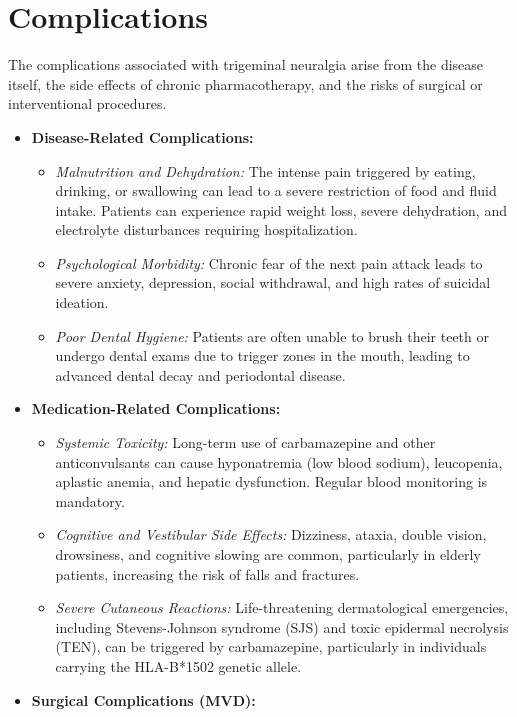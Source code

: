\section*{Complications}
The complications associated with trigeminal neuralgia arise from the disease itself, the side effects of chronic pharmacotherapy, and the risks of surgical or interventional procedures.
\begin{itemize}
  \item \textbf{Disease-Related Complications:}
  \begin{itemize}
    \item \textit{Malnutrition and Dehydration:} The intense pain triggered by eating, drinking, or swallowing can lead to a severe restriction of food and fluid intake. Patients can experience rapid weight loss, severe dehydration, and electrolyte disturbances requiring hospitalization.
    \item \textit{Psychological Morbidity:} Chronic fear of the next pain attack leads to severe anxiety, depression, social withdrawal, and high rates of suicidal ideation.
    \item \textit{Poor Dental Hygiene:} Patients are often unable to brush their teeth or undergo dental exams due to trigger zones in the mouth, leading to advanced dental decay and periodontal disease.
  \end{itemize}
  \item \textbf{Medication-Related Complications:}
  \begin{itemize}
    \item \textit{Systemic Toxicity:} Long-term use of carbamazepine and other anticonvulsants can cause hyponatremia (low blood sodium), leucopenia, aplastic anemia, and hepatic dysfunction. Regular blood monitoring is mandatory.
    \item \textit{Cognitive and Vestibular Side Effects:} Dizziness, ataxia, double vision, drowsiness, and cognitive slowing are common, particularly in elderly patients, increasing the risk of falls and fractures.
    \item \textit{Severe Cutaneous Reactions:} Life-threatening dermatological emergencies, including Stevens-Johnson syndrome (SJS) and toxic epidermal necrolysis (TEN), can be triggered by carbamazepine, particularly in individuals carrying the HLA-B*1502 genetic allele.
  \end{itemize}
  \item \textbf{Surgical Complications (MVD):}
  \begin{itemize}

\end{itemize}
\end{itemize}
